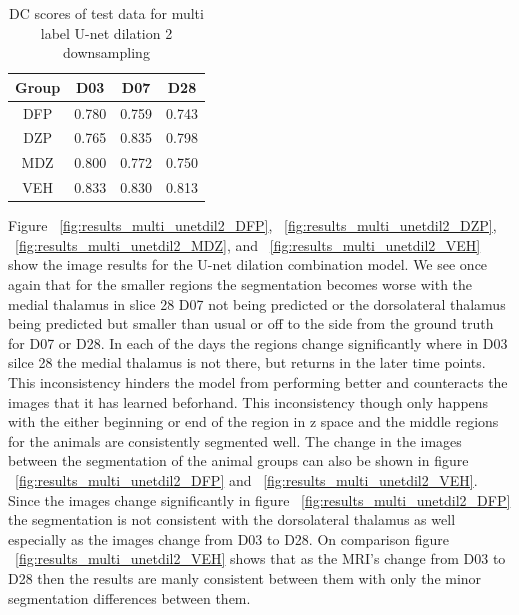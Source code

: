\begin{table}[tbh]
\renewcommand{\arraystretch}{1}
\centering
\begin{tabular}{|c|c|c|c|}
\hline
\textbf{Group} & \textbf{D03}& \textbf{D07}& \textbf{D28}\\
\hline
DFP & 0.780 & 0.759 & 0.743\\      
\hline
DZP & 0.765 & 0.835 & 0.798\\
\hline
MDZ & 0.800 & 0.772 & 0.750\\ 
\hline
VEH & 0.833 & 0.830 & 0.813\\ 
\hline
\end{tabular}
\caption{DC scores of test data for multi label U-net dilation 2 downsampling}
\label{tab.multi_model_results_unetdil2}
\end{table}

Figure ~\ref{fig:results_multi_unetdil2_DFP}, ~\ref{fig:results_multi_unetdil2_DZP}, ~\ref{fig:results_multi_unetdil2_MDZ}, and ~\ref{fig:results_multi_unetdil2_VEH} show the image results for the U-net dilation combination model. 
We see once again that for the smaller regions the segmentation becomes worse with the medial thalamus in slice 28 D07 not being predicted or the dorsolateral thalamus being predicted but smaller than usual or off to the side from the ground truth for D07 or D28. 
In each of the days the regions change significantly where in D03 silce 28 the medial thalamus is not there, but returns in the later time points.
This inconsistency hinders the model from performing better and counteracts the images that it has learned beforhand. 
This inconsistency though only happens with the either beginning or end of the region in z space and the middle regions for the animals are consistently segmented well. 
The change in the images between the segmentation of the animal groups can also be shown in figure ~\ref{fig:results_multi_unetdil2_DFP} and ~\ref{fig:results_multi_unetdil2_VEH}.
Since the images change significantly in figure ~\ref{fig:results_multi_unetdil2_DFP} the segmentation is not consistent with the dorsolateral thalamus as well especially as the images change from D03 to D28.
On comparison figure ~\ref{fig:results_multi_unetdil2_VEH} shows that as the MRI's change from D03 to D28 then the results are manly consistent between them with only the minor segmentation differences between them. 


